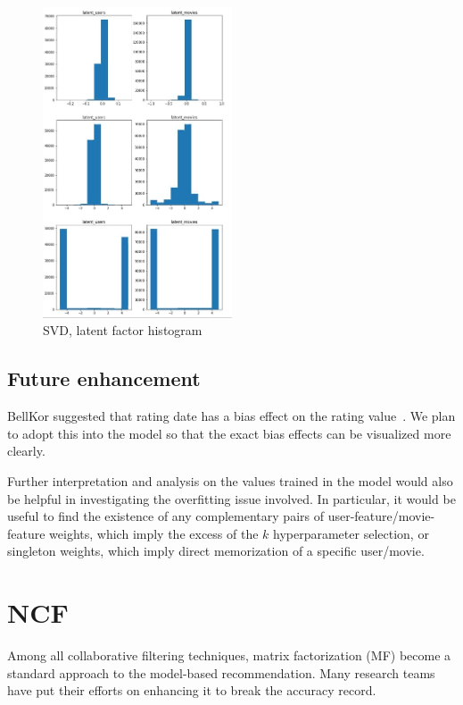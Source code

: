 \documentclass[final]{cvpr}
\begin{document}
\begin{figure}[h]
	\includegraphics[width=0.5\textwidth]{svd-histogram.jpg}
	\caption{SVD, latent factor histogram}
	\label{fig:svd-histogram}
\end{figure}

\subsection{Future enhancement}
BellKor suggested that rating date has a bias effect on the rating value~\cite{BellKor2008}.
We plan to adopt this into the model so that
the exact bias effects can be visualized more clearly.

Further interpretation and analysis on the values trained in the model
would also be helpful in investigating the overfitting issue involved.
In particular, it would be useful to find the existence of
any complementary pairs of user-feature/movie-feature weights,
which imply the excess of the $k$ hyperparameter selection,
or singleton weights,
which imply direct memorization of a specific user/movie.

\section{\ac{NCF}}

Among all collaborative filtering techniques, matrix factorization (MF) become a standard approach to the model-based recommendation. Many research teams have put their efforts on enhancing it to break the accuracy record. 
\end{document}
